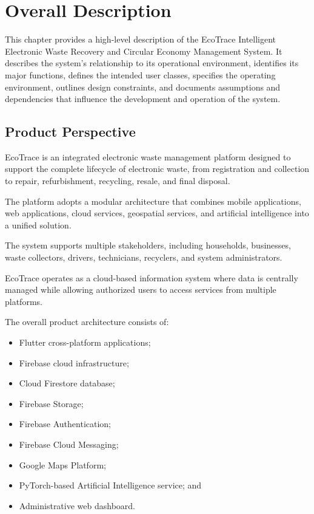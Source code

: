 \chapter{Overall Description}
\label{chap:overall-description}

This chapter provides a high-level description of the EcoTrace
Intelligent Electronic Waste Recovery and Circular Economy Management
System. It describes the system's relationship to its operational
environment, identifies its major functions, defines the intended user
classes, specifies the operating environment, outlines design
constraints, and documents assumptions and dependencies that influence
the development and operation of the system.

\section{Product Perspective}
\label{sec:product-perspective}

EcoTrace is an integrated electronic waste management platform designed
to support the complete lifecycle of electronic waste, from
registration and collection to repair, refurbishment, recycling,
resale, and final disposal.

The platform adopts a modular architecture that combines mobile
applications, web applications, cloud services, geospatial services,
and artificial intelligence into a unified solution.

The system supports multiple stakeholders, including households,
businesses, waste collectors, drivers, technicians, recyclers, and
system administrators.

EcoTrace operates as a cloud-based information system where data is
centrally managed while allowing authorized users to access services
from multiple platforms.

The overall product architecture consists of:

\begin{itemize}

\item Flutter cross-platform applications;

\item Firebase cloud infrastructure;

\item Cloud Firestore database;

\item Firebase Storage;

\item Firebase Authentication;

\item Firebase Cloud Messaging;

\item Google Maps Platform;

\item PyTorch-based Artificial Intelligence service; and

\item Administrative web dashboard.

\end{itemize}

